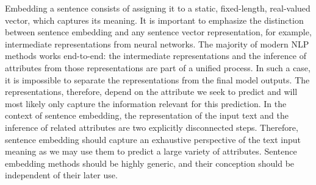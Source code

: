 Embedding a sentence consists of assigning it to a static, fixed-length, real-valued vector, which captures its meaning. It is important to emphasize the distinction between sentence embedding and any sentence vector representation, for example, intermediate representations from neural networks. The majority of modern NLP methods works end-to-end: the intermediate representations and the inference of attributes from those representations are part of a unified process. In such a case, it is impossible to separate the representations from the final model outputs. The representations, therefore, depend on the attribute we seek to predict and will most likely only capture the information relevant for this prediction. In the context of sentence embedding, the representation of the input text and the inference of related attributes are two explicitly disconnected steps. Therefore, sentence embedding should capture an exhaustive perspective of the text input meaning as we may use them to predict a large variety of attributes. Sentence embedding methods should be highly generic, and their conception should be independent of their later use.


